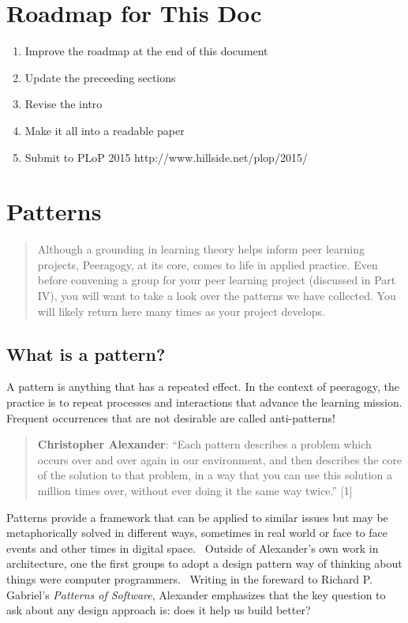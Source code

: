 \section{Roadmap for This Doc}

\begin{enumerate}
\item Improve the roadmap at the end of this document
\item Update the preceeding sections
\item Revise the intro
\item Make it all into a readable paper
\item Submit to PLoP 2015 http://www.hillside.net/plop/2015/
\end{enumerate}

\section{Patterns}

\begin{quote}
Although a grounding in learning theory helps inform peer learning
projects, Peeragogy, at its core, comes to life in applied practice.
Even before convening a group for your peer learning project
(discussed in Part IV), you will want to take a look
over the patterns we have collected.  You will likely return here many
times as your project develops.
\end{quote}

\subsection{What is a pattern?}

A pattern is anything that has a repeated effect. In the context of
peeragogy, the practice is to repeat processes and interactions that
advance the learning mission. Frequent occurrences that are not
desirable are called anti-patterns!

\begin{quote}
\textbf{Christopher Alexander}: ``Each pattern describes a problem which
occurs over and over again in our environment, and then describes the
core of the solution to that problem, in a way that you can use this
solution a million times over, without ever doing it the same way
twice.'' {[}1{]}
\end{quote}

Patterns provide a framework that can be applied to similar issues but
may be metaphorically solved in different ways, sometimes in real world
or face to face events and other times in digital space.~ Outside of
Alexander's own work in architecture, one the first groups to adopt a
design pattern way of thinking about things were computer programmers.~
Writing in the foreward to Richard P. Gabriel's \emph{Patterns of
Software}, Alexander emphasizes that the key question to ask about any
design approach is: does it help us build better?

